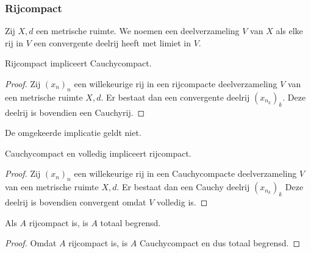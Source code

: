\documentclass[main.tex]{subfiles}
\begin{document}
\subsubsection{Rijcompact}
\label{sec:rijcompact}

\begin{de}
  \label{de:rijcompact}
  Zij $X,d$ een metrische ruimte.
  We noemen een deelverzameling $V$ van $X$  als elke rij in $V$ een convergente deelrij heeft met limiet in $V$.
\end{de}

\begin{st}
  \label{st:rijcompact-dan-cauchycompact}
  Rijcompact impliceert Cauchycompact.

  \begin{proof}
    Zij $(x_{n})_{n}$ een willekeurige rij in een rijcompacte deelverzameling $V$ van een metrische ruimte $X,d$.
    Er bestaat dan een convergente deelrij $(x_{n_{k}})_{k}$.
    Deze deelrij is bovendien een Cauchyrij.
  \end{proof}
\end{st}

\begin{tvb}
  De omgekeerde implicatie geldt niet.
\end{tvb}

\begin{st}
  \label{st:cauchycompact-en-volledig-dan-rijcompact}
  Cauchycompact en volledig impliceert rijcompact.

  \begin{proof}
    Zij $(x_{n})_{n}$ een willekeurige rij in een Cauchycompacte deelverzameling $V$ van een metrische ruimte $X,d$.
    Er bestaat dan een Cauchy deelrij $(x_{n_{k}})_{k}$
    Deze deelrij is bovendien convergent omdat $V$ volledig is.
  \end{proof}
\end{st}

\begin{pr}
  \label{pr:rijcompact-dan-totaal-begrensd}
  Als $A$ rijcompact is, is $A$ totaal begrensd.

  \begin{proof}
    Omdat $A$ rijcompact is, is $A$ Cauchycompact  en dus totaal begrensd.
  \end{proof}
\end{pr}
\end{document}
